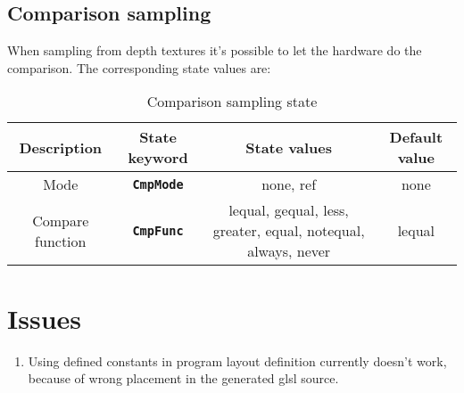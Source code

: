 \documentclass[11pt,a4paper,final,titlepage]{article}
\begin{document}
\subsection{Comparison sampling}
When sampling from depth textures it's possible to let the hardware do the comparison.
The corresponding state values are:
\begin{table}[h]
\centering
\begin{tabulary}{\linewidth}{|C|C|C|C|}
\hline
Description & State keyword & State values & Default value\\
\hline\hline
Mode & \texttt{\textbf{CmpMode}} & none, ref & none\\
\hline
Compare function & \texttt{\textbf{CmpFunc}} &
lequal, gequal, less, greater, equal, notequal, always, never & lequal\\
\hline
\end{tabulary}
\caption{Comparison sampling state}
\label{tab:compModes}
\end{table}

\pagebreak
\section{Issues}
\begin{enumerate}
\item Using defined constants in program layout definition currently doesn't work, because
of wrong placement in the generated glsl source.
\end{enumerate}
\end{document}
